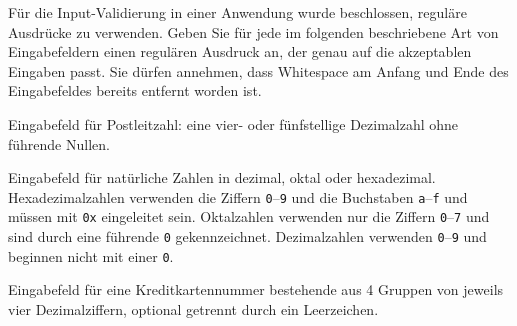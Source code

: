 Für die Input-Validierung in einer Anwendung wurde beschlossen,
reguläre Ausdrücke zu verwenden.
Geben Sie für jede im folgenden beschriebene Art von Eingabefeldern
einen regulären Ausdruck an, der genau auf die akzeptablen Eingaben passt.
Sie dürfen annehmen, dass Whitespace am Anfang und Ende des Eingabefeldes
bereits entfernt worden ist.
\begin{teilaufgaben}
\item Eingabefeld für Postleitzahl: eine vier- oder fünfstellige Dezimalzahl
ohne führende Nullen.
\item Eingabefeld für natürliche Zahlen in dezimal, oktal oder hexadezimal.
Hexadezimalzahlen verwenden die Ziffern \texttt{0}--\texttt{9} und die
Buchstaben \texttt{a}--\texttt{f} und müssen mit \texttt{0x} eingeleitet
sein.
Oktalzahlen verwenden nur die Ziffern \texttt{0}--\texttt{7} und sind
durch eine führende \texttt{0} gekennzeichnet.
Dezimalzahlen verwenden \texttt{0}--\texttt{9} und beginnen nicht mit einer
\texttt{0}.
\item Eingabefeld für eine Kreditkartennummer bestehende aus 4 Gruppen
von jeweils vier Dezimalziffern, optional getrennt durch ein Leerzeichen.
\end{teilaufgaben}


